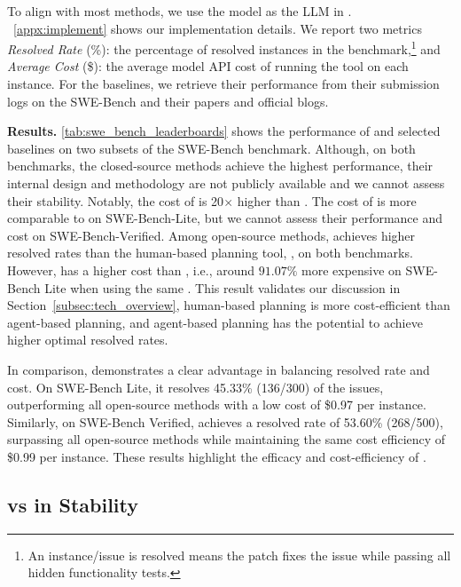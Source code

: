 To align with most methods, we use the \claude model as the LLM in \sys.
~\cref{appx:implement} shows our implementation details.
We report two metrics \textit{Resolved Rate} (\%): the percentage of resolved instances in the benchmark,\footnote{An instance/issue is resolved means the patch fixes the issue while passing all hidden functionality tests.} and \textit{Average Cost} (\$): the average model API cost of running the tool on each instance. 
For the baselines, we retrieve their performance from their submission logs on the SWE-Bench and their papers and official blogs. 

\noindent\textbf{Results.}
\cref{tab:swe_bench_leaderboards} shows the performance of \sys and selected baselines on two subsets of the SWE-Bench benchmark.
Although, on both benchmarks, the closed-source methods achieve the highest performance, their internal design and methodology are not publicly available and we cannot assess their stability.
Notably, the cost of \codestory is 20$\times$ higher than \sys.
The cost of \globant is more comparable to \sys on SWE-Bench-Lite, but we cannot assess their performance and cost on SWE-Bench-Verified. 
Among open-source methods, \openhands achieves higher resolved rates than the human-based planning tool, \agentless, on both benchmarks. 
However, \openhands has a higher cost than \agentless, i.e., around $91.07\%$ more expensive on SWE-Bench Lite when using the same \claude. 
This result validates our discussion in Section~\ref{subsec:tech_overview}, human-based planning is more cost-efficient than agent-based planning, and agent-based planning has the potential to achieve higher optimal resolved rates.

In comparison, \sys demonstrates a clear advantage in balancing resolved rate and cost. 
On SWE-Bench Lite, it resolves 45.33\% (136/300) of the issues, outperforming all open-source methods with a low cost of \$0.97 per instance. 
Similarly, on SWE-Bench Verified, \sys achieves a resolved rate of 53.60\% (268/500), surpassing all open-source methods while maintaining the same cost efficiency of \$0.99 per instance.
These results highlight the efficacy and cost-efficiency of \sys.


\subsection{\sys vs \openhands in Stability}
\label{exp:Stability}

